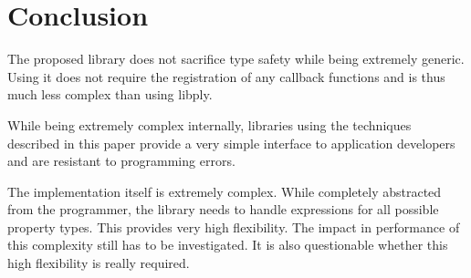 \section{Conclusion}

The proposed library does not sacrifice type safety while being extremely
generic. Using it does not require the registration of any callback functions
and is thus much less complex  than using libply.


While being extremely complex internally, libraries using the techniques
described in this paper provide a very simple interface to application
developers and are resistant to programming errors.


The implementation itself is extremely complex. While completely abstracted from
the programmer, the library needs to handle expressions for all possible
property types. This provides very high flexibility. The impact in performance
of this complexity still has to be investigated. It is also questionable whether
this high flexibility is really required.


